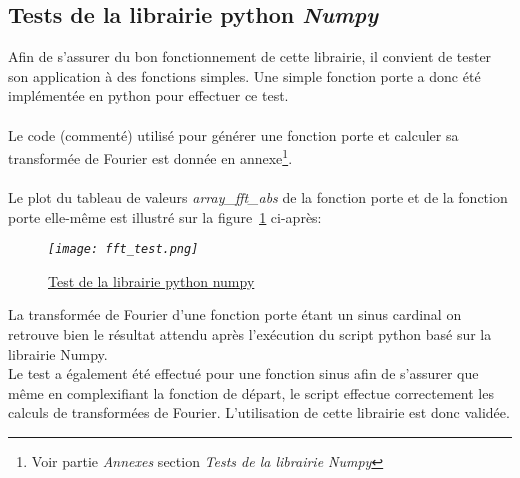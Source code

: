 \documentclass[12pt,fleqn]{book} %
\begin{document}
\subsection{Tests de la librairie python \emph{Numpy}}
Afin de s'assurer du bon fonctionnement de cette librairie, il convient de tester son application à des fonctions simples. Une simple fonction porte a donc été implémentée en python pour effectuer ce test.
~\\\\Le code (commenté) utilisé pour générer une fonction porte et calculer sa transformée de Fourier est donnée en annexe\footnote{Voir partie \emph{Annexes} section \emph{Tests de la librairie Numpy}}.
~\\\\Le plot du tableau de valeurs \emph{array\_fft\_abs} de la fonction porte et de la fonction porte elle-même est illustré sur la figure~\underline{\color{blue}\ref{fft_test}} ci-après:
\begin{figure}[H]
	\centering
	\itshape
	\texttt{[image: fft\_test.png]}
	\caption{\label{fft_test} \underline{Test de la librairie python numpy}}
\end{figure}
La transformée de Fourier d'une fonction porte étant un sinus cardinal on retrouve bien le résultat attendu après l'exécution du script python basé sur la librairie Numpy.
~\\Le test a également été effectué pour une fonction sinus afin de s'assurer que même en complexifiant la fonction de départ, le script effectue correctement les calculs de transformées de Fourier. L'utilisation de cette librairie est donc validée.
\end{document}
